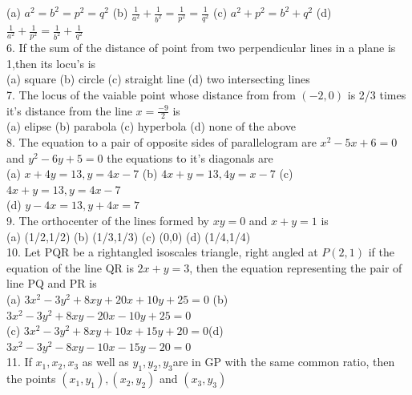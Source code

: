 \documentclass[12pt]{article}
\begin{document}
(a)  $a^2=b^2=p^2=q^2$ \hspace{1cm}(b)  $\frac{1}{a^2} +\frac{1}{b^2}= \frac{1}{p^2}=\frac{1}{q^2}$ \hspace{1cm}  (c) $a^2+p^2=b^2+q^2$ \hspace{1cm}(d) $\frac{1}{a^2}+\frac{1}{p^2}=\frac{1}{b^2}+\frac{1}{q^2}$\\
6. If the sum of the distance of point from two perpendicular lines in a plane is 1,then its locu's is \\
(a) square \hspace{1cm}  (b) circle \hspace{1cm} (c)  straight line  \hspace{1cm}(d)  two intersecting lines\\
7. The locus of the vaiable point whose distance from from $(-2,0)$ is 2/3 times it's distance from the line $x=\frac{-9}{2}$ is\\
(a) elipse  \hspace{1cm} (b)  parabola  \hspace{1cm} (c) hyperbola   \hspace{1cm}  (d) none of the above\\
8. The equation to a pair of  opposite sides of parallelogram are $x^2-5x+6=0$ and $y^2-6y+5=0$ the equations to it's diagonals are\\
(a)  $x+4y=13, y=4x-7$  \hspace{1cm} (b)   $4x+y=13, 4y=x-7$ \hspace{1cm}   (c)  $4x+y=13, y=4x-7$\\
(d)  $y-4x=13,y+4x=7$ \\
9. The orthocenter of the lines formed by $xy=0$ and $x+y=1$ is\\
(a)  (1/2,1/2) \hspace{1cm} (b)  (1/3,1/3) \hspace{1cm}  (c)  (0,0) \hspace{1cm} (d)  (1/4,1/4)\\
10. Let PQR be a rightangled isoscales triangle, right angled at $P(2,1)$ if the equation of the line QR is $2x+y=3$, then the equation representing the pair of line PQ and PR is\\
(a)  $3x^2-3y^2+8xy+20x+10y+25=0$\hspace{1cm} (b)  $3x^2-3y^2+8xy-20x-10y+25=0$\\
(c)  $3x^2-3y^2+8xy+10x+15y+20=0$\hspace{1cm}(d)  $3x^2-3y^2-8xy-10x-15y-20=0$\\
11. If $x_1,x_2,x_3$ as well as $y_1,y_2,y_3 $are in GP with the same common ratio, then the points $(x_1,y_1),(x_2,y_2)$ and $(x_3,y_3)$\\
\end{document}
